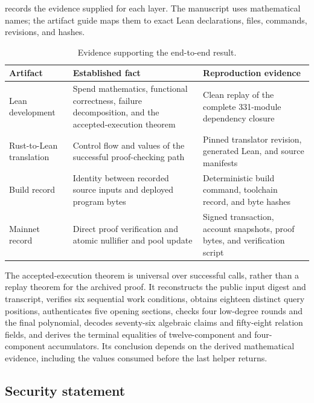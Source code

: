 records the evidence supplied for each layer.
The manuscript uses mathematical names; the artifact guide maps them to exact
Lean declarations, files, commands, revisions, and hashes.

\begin{table}[t]
\centering
\small
\caption{Evidence supporting the end-to-end result.}
\label{tab:evidence-pipeline}
\begin{tabularx}{\textwidth}{@{}R{0.20\textwidth}YY@{}}
\toprule
Artifact & Established fact & Reproduction evidence \\
\midrule
Lean development & Spend mathematics, functional correctness, failure
decomposition, and the accepted-execution theorem & Clean replay of the
complete 331-module dependency closure \\
Rust-to-Lean translation & Control flow and values of the successful
proof-checking path & Pinned translator revision, generated Lean, and source
manifests \\
Build record & Identity between recorded source inputs and deployed program
bytes & Deterministic build command, toolchain record, and byte hashes \\
Mainnet record & Direct proof verification and atomic nullifier and pool
update & Signed transaction, account snapshots, proof bytes, and verification
script \\
\bottomrule
\end{tabularx}
\end{table}

The accepted-execution theorem is universal over successful calls, rather
than a replay theorem for the archived proof.  It reconstructs the public
input digest and transcript, verifies six sequential work conditions, obtains
eighteen distinct query positions, authenticates five opening sections,
checks four low-degree rounds and the final polynomial, decodes seventy-six
algebraic claims and fifty-eight relation fields, and derives the terminal
equalities of twelve-component and four-component accumulators.  Its
conclusion depends on the derived mathematical evidence, including the values
consumed before the last helper returns.

\subsection{Security statement}


